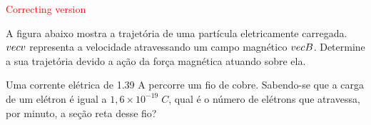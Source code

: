 \documentclass[12pt, addpoints]{exam}
\begin{document}
        \begin{center}
\textcolor{red}{\emph\Large Correcting version}\end{center}
\begin{questions}
\begin{multicols*}{2}
\question[20] A ﬁgura abaixo mostra a trajetória de uma partícula eletricamente carregada. $\\vec{{v}}$ representa a velocidade atravessando um campo magnético $\\vec{{B}}$. Determine a sua trajetória devido a ação da força magnética atuando sobre ela.
        
        \begin{center}
            \begin{minipage}[c]{0.5\linewidth}
            \end{minipage}
        \end{center}

        

\begin{oneparchoices}
\end{oneparchoices}
\question[20] Uma corrente elétrica de    1.39 A percorre um ﬁo de cobre. Sabendo-se que a carga de um elétron é igual a $1,6\times 10^{-19}\;C$, qual é o número de elétrons que atravessa, por minuto, a seção reta desse ﬁo?


\end{multicols*}
\end{questions}
\end{document}
